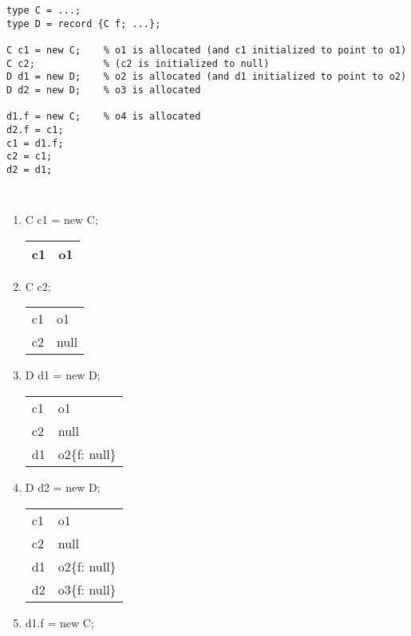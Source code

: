 \documentclass[11pt]{exam}
\begin{document}
\begin{questions}
\begin{lstlisting}
type C = ...;
type D = record {C f; ...};

C c1 = new C;    % o1 is allocated (and c1 initialized to point to o1)
C c2;            % (c2 is initialized to null)
D d1 = new D;    % o2 is allocated (and d1 initialized to point to o2)
D d2 = new D;    % o3 is allocated

d1.f = new C;    % o4 is allocated
d2.f = c1;
c1 = d1.f;
c2 = c1;
d2 = d1;
\end{lstlisting}

	\begin{framed}

            {\tt
            \begin{enumerate}
                \item C c1 = new C;    %

                    \begin{tabular}{|l|l|}
                        \hline
                        c1 & o1 \\
                        \hline
                    \end{tabular}
                \item C c2;            %

                    \begin{tabular}{|l|l|}
                        \hline
                        c1 & o1 \\
                        c2 & null \\
                        \hline
                    \end{tabular}
                \item D d1 = new D;    %

                    \begin{tabular}{|l|l|}
                        \hline
                        c1 & o1 \\
                        c2 & null \\
                        d1 & o2\{f: null\} \\
                        \hline
                    \end{tabular}
                \item D d2 = new D;    %

                    \begin{tabular}{|l|l|}
                        \hline
                        c1 & o1 \\
                        c2 & null \\
                        d1 & o2\{f: null\} \\
                        d2 & o3\{f: null\} \\
                        \hline
                    \end{tabular}
                \item d1.f = new C;


\end{enumerate}}
\end{framed}
\end{questions}
\end{document}
